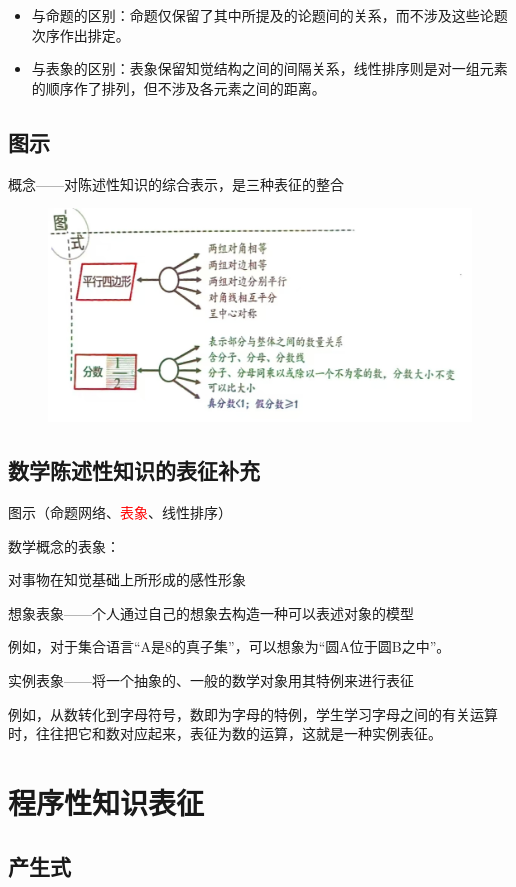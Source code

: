 \begin{itemize}
    \item 与命题的区别：命题仅保留了其中所提及的论题间的关系，而不涉及这些论题次序作出排定。
    \item 与表象的区别：表象保留知觉结构之间的间隔关系，线性排序则是对一组元素的顺序作了排列，但不涉及各元素之间的距离。
\end{itemize}

\subsection{图示}

概念——对陈述性知识的综合表示，是三种表征的整合

\begin{figure}[htbp]
    \centering
    \includegraphics[width=0.5\linewidth]{image/tushilizi.jpg}
\end{figure}

\subsection{数学陈述性知识的表征补充}

图示（命题网络、\textcolor{red}{表象}、线性排序）

数学概念的表象：

\noindent
对事物在知觉基础上所形成的感性形象

\noindent
想象表象——个人通过自己的想象去构造一种可以表述对象的模型

例如，对于集合语言“A是8的真子集”，可以想象为“圆A位于圆B之中”。

\noindent
实例表象——将一个抽象的、一般的数学对象用其特例来进行表征

例如，从数转化到字母符号，数即为字母的特例，学生学习字母之间的有关运算时，往往把它和数对应起来，表征为数的运算，这就是一种实例表征。

\section{程序性知识表征}

\subsection{产生式}

